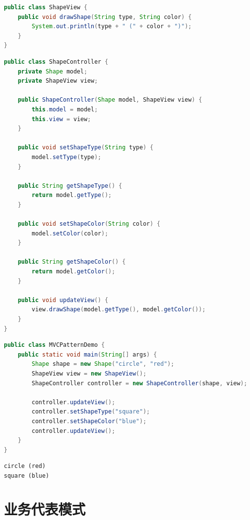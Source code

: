 \begin{lstlisting}[language=Java, title=ShapeView.java]
public class ShapeView {
    public void drawShape(String type, String color) {
        System.out.println(type + " (" + color + ")");
    }
}
\end{lstlisting}

\begin{lstlisting}[language=Java, title=ShapeController.java]
public class ShapeController {
    private Shape model;
    private ShapeView view;

    public ShapeController(Shape model, ShapeView view) {
        this.model = model;
        this.view = view;
    }

    public void setShapeType(String type) {
        model.setType(type);
    }

    public String getShapeType() {
        return model.getType();
    }

    public void setShapeColor(String color) {
        model.setColor(color);
    }

    public String getShapeColor() {
        return model.getColor();
    }

    public void updateView() {
        view.drawShape(model.getType(), model.getColor());
    }
}    
\end{lstlisting}

\begin{lstlisting}[language=Java, title=MVCPatternDemo.java]
public class MVCPatternDemo {
    public static void main(String[] args) {
        Shape shape = new Shape("circle", "red");
        ShapeView view = new ShapeView();
        ShapeController controller = new ShapeController(shape, view);

        controller.updateView();
        controller.setShapeType("square");
        controller.setShapeColor("blue");
        controller.updateView();
    }
}
\end{lstlisting}

\begin{tcolorbox}
    \begin{verbatim}
circle (red)
square (blue)
\end{verbatim}
\end{tcolorbox}

\newpage

\section{业务代表模式}

